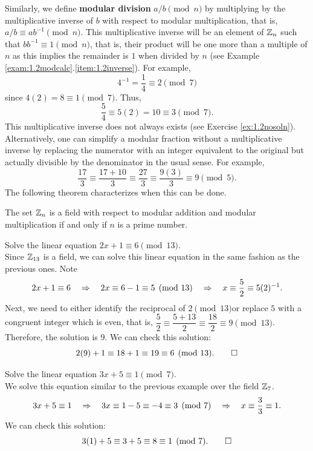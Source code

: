 Similarly, we define  \textbf{modular division} $a/b \pmod n$ by multiplying by the multiplicative inverse of $b$ with respect to modular multiplication, that is, $a/b \equiv ab^{-1} \pmod n$. This multiplicative inverse will be an element of $\mathbb{Z}_n$ such that $bb^{-1} \equiv 1 \pmod n$, that is, their product will be one more than a multiple of $n$ as this implies the remainder is $1$ when divided by $n$ (see Example \ref{exam:1.2modcalc}.\ref{item:1.2inverse}). For example, \[4^{-1} = \dfrac{1}{4}\equiv 2 \pmod 7\] since $4(2) = 8 \equiv 1\pmod 7$. Thus, \[\dfrac{5}{4} \equiv 5(2) = 10 \equiv 3\pmod 7.\]  This multiplicative inverse does not always exists (see Exercise \ref{ex:1.2nosoln}).\\ %

 Alternatively, one can simplify a modular fraction without a multiplicative inverse by replacing the numerator with an integer equivalent to the original but actually divisible by the denominator in the usual sense. For example, \[\dfrac{17}{3} \equiv \dfrac{17+10}{3} \equiv \dfrac{27}{3} \equiv \dfrac{9(3)}{3} \equiv 9\pmod 5.\] The following theorem characterizes when this can be done.\\

\begin{Thm} The set $\mathbb{Z}_n$ is a field with respect to modular addition and modular multiplication if and only if $n$ is a prime number.
\end{Thm}\vs

\begin{Exam} Solve the linear equation $2x+1\equiv 6 \pmod{13}$. \\ 

Since $\mathbb{Z}_{13}$ is a field, we can solve this linear equation in the same fashion as the previous ones. Note
\[2x+1\equiv 6 \quad\Rightarrow\quad 2x \equiv 6-1 \equiv 5 \pmod {13} \quad\Rightarrow\quad x \equiv \dfrac{5}{2} \equiv 5(2)^{-1}.\] Next, we need to either identify the reciprocal of $2 \pmod{13}$\footnotemark[2] or replace $5$ with a congruent integer which is even, that is, $\dfrac{5}{2} \equiv \dfrac{5+13}{2} \equiv \dfrac{18}{2} \equiv 9\pmod{13}$. Therefore, the solution is 9. We can check this solution:
\[2(9) +1 \equiv 18 + 1 \equiv 19 \equiv 6 \pmod{13}.\qedhere\]
\end{Exam}\vs 

\begin{Exam} Solve the linear equation $3x+5\equiv 1 \pmod{7}$. \\ %

We solve this equation similar to the previous example over the field $\mathbb{Z}_{7}$. 
\[3x+5\equiv 1 \quad\Rightarrow\quad 3x \equiv 1-5 \equiv -4 \equiv 3 \pmod {7} \quad\Rightarrow\quad x \equiv \dfrac{3}{3} \equiv 1.\]  We can check this solution:
\[3(1)+5 \equiv 3+5 \equiv 8 \equiv 1 \pmod{7}.\qedhere\]
\end{Exam}\vs
 
